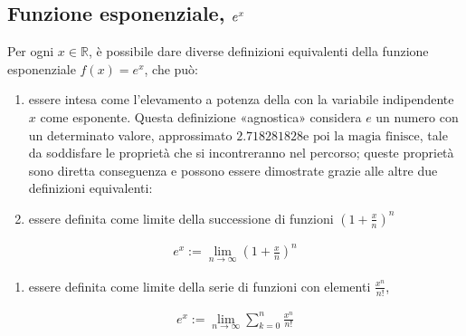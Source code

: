 \documentclass[letterpaper,10pt,italian]{jupyterBook}
\begin{document}
\subsection{Funzione esponenziale, \protect\(e^x\protect\)}
\label{\detokenize{ch/precalculus/exponential_logarithm:funzione-esponenziale-e-x}}\label{\detokenize{ch/precalculus/exponential_logarithm:math-hs-exp-def}}
\sphinxAtStartPar
{} Per ogni \(x \in \mathbb{R}\), è possibile dare diverse definizioni equivalenti della funzione esponenziale \(f(x) = e^x\), che può:
\begin{enumerate}
%
\item {} 
\sphinxAtStartPar
essere intesa come l’elevamento a potenza della {\hyperref[\detokenize{ch/series/series-numerical-real:math-hs-series-e-euler}]{}} con la variabile indipendente \(x\) come esponente. Questa definizione «agnostica» considera \(e\) un numero con un determinato valore, approssimato \(2.718281828\text{e poi la magia finisce}\), tale da soddisfare le proprietà che si incontreranno nel percorso; queste proprietà sono diretta conseguenza e possono essere dimostrate grazie alle altre due definizioni equivalenti:

\item {} 
\sphinxAtStartPar
essere definita come limite della successione di funzioni \(\left( 1 + \frac{x}{n} \right)^n\)

\end{enumerate}
\begin{equation*}
\begin{split}
  e^x := \lim_{n \rightarrow \infty} \left( 1 + \frac{x}{n}\right)^n
\end{split}
\end{equation*}\begin{enumerate}
%
\setcounter{enumi}{2}
\item {} 
\sphinxAtStartPar
essere definita come limite della serie di funzioni con elementi \(\frac{x^n}{n!}\),

\end{enumerate}
\begin{equation*}
\begin{split}
  e^x := \lim_{n \rightarrow \infty} \sum_{k=0}^{n} \frac{x^n}{n!} \\
\end{split}
\end{equation*}
\end{document}
